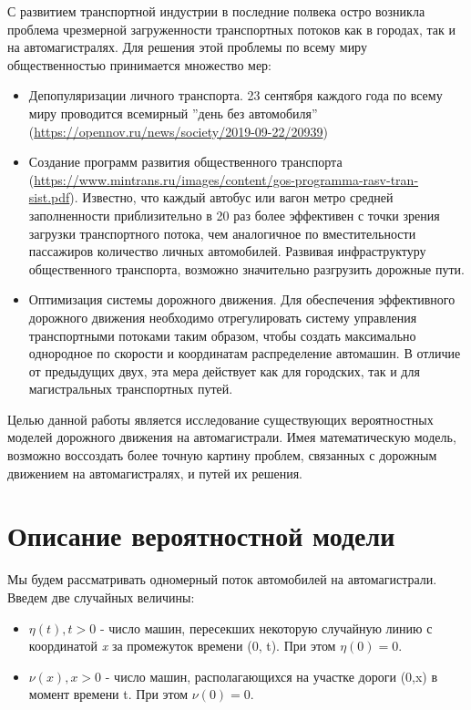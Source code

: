 \documentclass[a4paper, 14pt, russian]{article}
\begin{document}
С развитием транспортной индустрии в последние полвека остро возникла проблема чрезмерной загруженности транспортных потоков как в городах, так и на автомагистралях. Для решения этой проблемы по всему миру общественностью принимается множество мер:
\begin{itemize}
\item Депопуляризации личного транспорта. 23 сентября каждого года по всему миру проводится всемирный ''день без автомобиля'' (\url{https://opennov.ru/news/society/2019-09-22/20939})
\item Создание программ развития общественного транспорта (\url{https://www.mintrans.ru/images/content/gos-programma-rasv-tran-sist.pdf}). Известно, что каждый автобус или вагон метро средней заполненности приблизительно в 20 раз более эффективен с точки зрения загрузки транспортного потока, чем аналогичное по вместительности пассажиров количество личных автомобилей. Развивая инфраструктуру общественного транспорта, возможно значительно разгрузить дорожные пути.
\item Оптимизация системы дорожного движения. Для обеспечения эффективного дорожного движения необходимо отрегулировать систему управления транспортными потоками таким образом, чтобы создать максимально однородное по скорости и координатам распределение автомашин. В отличие от предыдущих двух, эта мера действует как для городских, так и для магистральных транспортных путей.
\end{itemize}

Целью данной работы является исследование существующих вероятностных моделей дорожного движения на автомагистрали. Имея математическую модель, возможно воссоздать более точную картину проблем, связанных с дорожным движением на автомагистралях, и путей их решения.
\section{Описание вероятностной модели}

Мы будем рассматривать одномерный поток автомобилей на автомагистрали. Введем две  случайных величины:

\begin{itemize}
\item $\eta(t), t > 0$ - число машин, пересекших некоторую случайную линию с координатой \textit{x} за промежуток времени (0, t). При этом $\eta(0) = 0$.
\item $\nu(x), x > 0$ - число машин, располагающихся на участке дороги (0,x) в момент времени t. При этом $\nu(0) = 0$.
\end{itemize}
\end{document}
